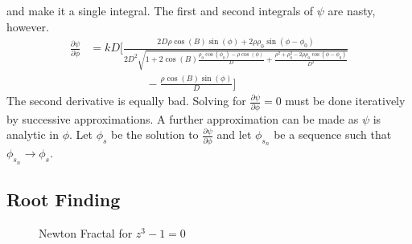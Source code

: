         and make it a single integral. The first and
        second integrals of $\psi$ are nasty, however.
        \begin{equation}
            \begin{split}
                \frac{\partial\psi}{\partial\phi}
                &=kD\Big[\frac{2D\rho\cos(B)
                    \sin(\phi)+2\rho\rho_{0}
                \sin(\phi-\phi_{0})}{2D^2\sqrt{1+2\cos(B)
                \frac{\rho_{0}\cos(\phi_{0})-\rho\cos(\phi)}{D}+
                \frac{\rho^{2}+\rho_{0}^{2}-
                2\rho\rho_{0}\cos(\phi-\phi_{0})}{D^2}}}\\
                &\quad\quad\quad\quad\quad
                -\frac{\rho\cos(B)\sin(\phi)}{D}\Big]
            \end{split}
        \end{equation}
        The second derivative is equally bad.
        Solving for $\frac{\partial\psi}{\partial\phi}=0$
        must be done iteratively by successive approximations.
        A further approximation can be made as $\psi$
        is analytic in $\phi$. Let $\phi_{s}$ be
        the solution to $\frac{\partial\psi}{\partial\phi}$
        and let $\phi_{s_{n}}$ be a sequence such that
        $\phi_{s_{n}}\rightarrow\phi_{s}$.
    \subsection{Root Finding}
        \begin{figure}[H]
            \centering
            \captionsetup{type=figure}
            \caption{Newton Fractal for $z^{3}-1=0$}
            \label{fig:Diff_Theory_Newton_Fractal}
        \end{figure}
